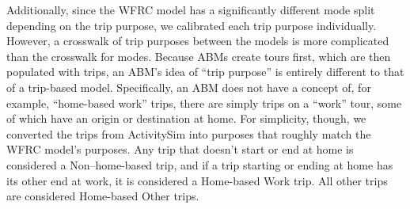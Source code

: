 \documentclass[fancy, oneside, mastersfancy, ms]{byuthesis}
\begin{document}
\begin{table}

\caption{\label{tbl-mode-crosswalk}Crosswalk Between Modes in Both
Models}


\end{table}%

Additionally, since the WFRC model has a significantly different mode
split depending on the trip purpose, we calibrated each trip purpose
individually. However, a crosswalk of trip purposes between the models
is more complicated than the crosswalk for modes. Because ABMs create
tours first, which are then populated with trips, an ABM's idea of
``trip purpose'' is entirely different to that of a trip-based model.
Specifically, an ABM does not have a concept of, for example,
``home-based work'' trips, there are simply trips on a ``work'' tour,
some of which have an origin or destination at home. For simplicity,
though, we converted the trips from ActivitySim into purposes that
roughly match the WFRC model's purposes. Any trip that doesn't start or
end at home is considered a Non--home-based trip, and if a trip starting
or ending at home has its other end at work, it is considered a
Home-based Work trip. All other trips are considered Home-based Other
trips.
\end{document}
